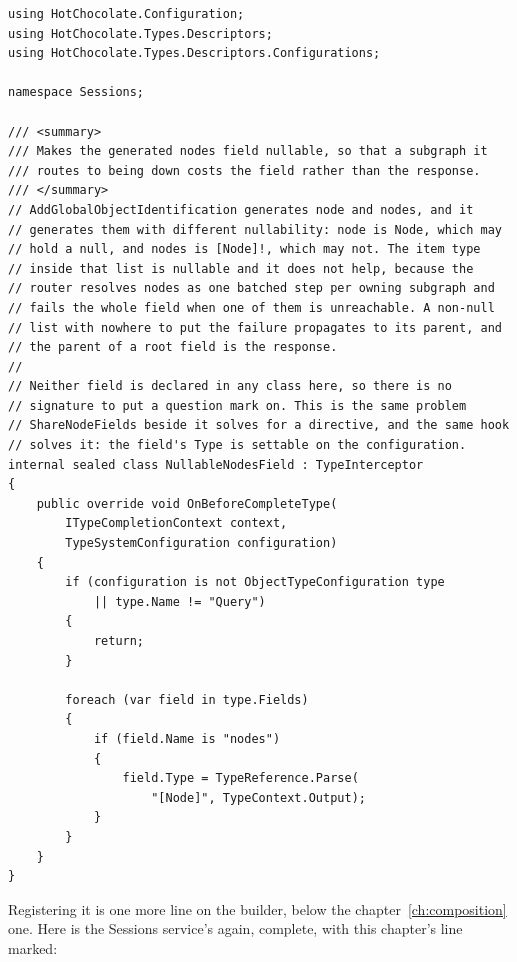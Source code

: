 \begin{verbatim}
using HotChocolate.Configuration;
using HotChocolate.Types.Descriptors;
using HotChocolate.Types.Descriptors.Configurations;

namespace Sessions;

/// <summary>
/// Makes the generated nodes field nullable, so that a subgraph it
/// routes to being down costs the field rather than the response.
/// </summary>
// AddGlobalObjectIdentification generates node and nodes, and it
// generates them with different nullability: node is Node, which may
// hold a null, and nodes is [Node]!, which may not. The item type
// inside that list is nullable and it does not help, because the
// router resolves nodes as one batched step per owning subgraph and
// fails the whole field when one of them is unreachable. A non-null
// list with nowhere to put the failure propagates to its parent, and
// the parent of a root field is the response.
//
// Neither field is declared in any class here, so there is no
// signature to put a question mark on. This is the same problem
// ShareNodeFields beside it solves for a directive, and the same hook
// solves it: the field's Type is settable on the configuration.
internal sealed class NullableNodesField : TypeInterceptor
{
    public override void OnBeforeCompleteType(
        ITypeCompletionContext context,
        TypeSystemConfiguration configuration)
    {
        if (configuration is not ObjectTypeConfiguration type
            || type.Name != "Query")
        {
            return;
        }

        foreach (var field in type.Fields)
        {
            if (field.Name is "nodes")
            {
                field.Type = TypeReference.Parse(
                    "[Node]", TypeContext.Output);
            }
        }
    }
}
\end{verbatim}

%
Registering it is one more line on the builder, below the
chapter~\ref{ch:composition} one. Here is the Sessions service's
 again, complete, with this chapter's line marked:


